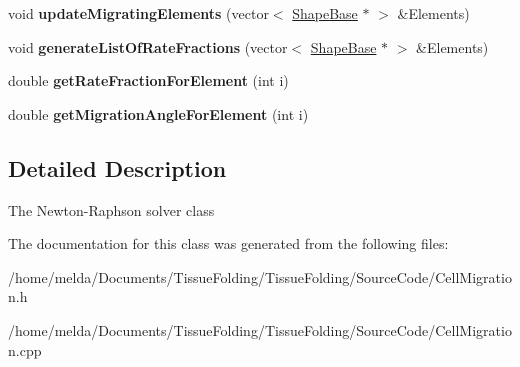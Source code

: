 \begin{DoxyCompactItemize}
\item 
\hypertarget{classCellMigration_ad6031e47703766afb5db05a97b5dbe60}{}void {\bfseries update\+Migrating\+Elements} (vector$<$ \hyperlink{classShapeBase}{Shape\+Base} $\ast$ $>$ \&Elements)\label{classCellMigration_ad6031e47703766afb5db05a97b5dbe60}

\item 
\hypertarget{classCellMigration_a4682d58a23fcfaf162cdf23ea2db3e11}{}void {\bfseries generate\+List\+Of\+Rate\+Fractions} (vector$<$ \hyperlink{classShapeBase}{Shape\+Base} $\ast$ $>$ \&Elements)\label{classCellMigration_a4682d58a23fcfaf162cdf23ea2db3e11}

\item 
\hypertarget{classCellMigration_af84d846f6b39dec5d25e7f74ae6c34fe}{}double {\bfseries get\+Rate\+Fraction\+For\+Element} (int i)\label{classCellMigration_af84d846f6b39dec5d25e7f74ae6c34fe}

\item 
\hypertarget{classCellMigration_a1d9c71e1a95091f141a442c7a5834913}{}double {\bfseries get\+Migration\+Angle\+For\+Element} (int i)\label{classCellMigration_a1d9c71e1a95091f141a442c7a5834913}

\end{DoxyCompactItemize}


\subsection{Detailed Description}
The Newton-\/\+Raphson solver class 

The documentation for this class was generated from the following files\+:\begin{DoxyCompactItemize}
\item 
/home/melda/\+Documents/\+Tissue\+Folding/\+Tissue\+Folding/\+Source\+Code/Cell\+Migration.\+h\item 
/home/melda/\+Documents/\+Tissue\+Folding/\+Tissue\+Folding/\+Source\+Code/Cell\+Migration.\+cpp\end{DoxyCompactItemize}
